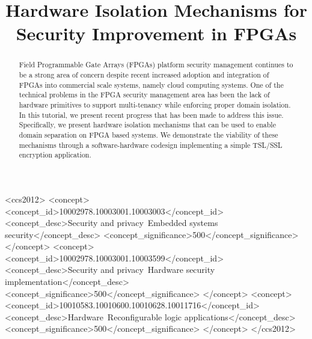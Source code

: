 \documentclass[sigconf]{acmart}
\theoremstyle{plain}
\theoremstyle{remark}
\begin{document}
\title{Hardware Isolation Mechanisms for Security Improvement in FPGAs}
%
%
%
%


\begin{abstract}
Field Programmable Gate Arrays (FPGAs) platform security management continues to be a strong area of concern despite recent increased adoption and integration of FPGAs into commercial scale systems, namely cloud computing systems. One of the technical problems in the FPGA security management area has been the lack of hardware primitives to support multi-tenancy while enforcing proper domain isolation. In this tutorial, we present recent progress that has been made to address this issue. Specifically, we present hardware isolation mechanisms that can be used to enable domain separation on FPGA based systems. We demonstrate the viability of these mechanisms through a software-hardware codesign implementing a simple TSL/SSL encryption application.
\end{abstract}


\begin{CCSXML}
<ccs2012>
<concept>
<concept_id>10002978.10003001.10003003</concept_id>
<concept_desc>Security and privacy~Embedded systems security</concept_desc>
<concept_significance>500</concept_significance>
</concept>
<concept>
<concept_id>10002978.10003001.10003599</concept_id>
<concept_desc>Security and privacy~Hardware security implementation</concept_desc>
<concept_significance>500</concept_significance>
</concept>
<concept>
<concept_id>10010583.10010600.10010628.10011716</concept_id>
<concept_desc>Hardware~Reconfigurable logic applications</concept_desc>
<concept_significance>500</concept_significance>
</concept>
</ccs2012>
\end{CCSXML}

\end{document}

